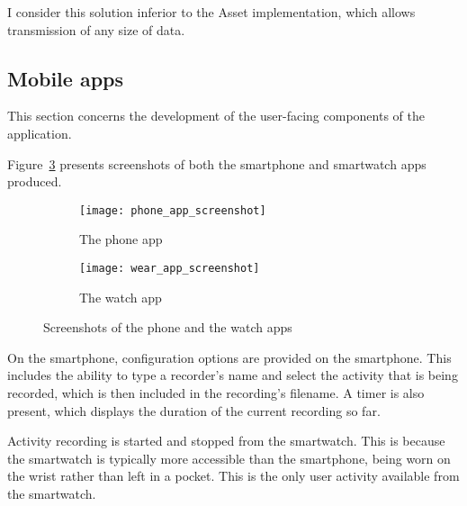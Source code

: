       I consider this solution inferior to the Asset implementation, which allows transmission of any size of data.
    \subsection{Mobile apps}
      This section concerns the development of the user-facing components of the application. 
      
      Figure~\ref{fig:app_screenshots} presents screenshots of both the smartphone and smartwatch apps produced.

      \begin{figure}[!th]
        \centering
        \begin{subfigure}[b]{0.3\textwidth}
                \texttt{[image: phone\_app\_screenshot]}
                \caption{The phone app}
                \label{fig:phone_app_screenshot}
        \end{subfigure}
        \qquad
        \begin{subfigure}[b]{0.3\textwidth}
                \texttt{[image: wear\_app\_screenshot]}
                \caption{The watch app}
                \label{fig:wear_app_screenshot}
        \end{subfigure}
        \caption{Screenshots of the phone and the watch apps}
        \label{fig:app_screenshots}
      \end{figure}
      
      On the smartphone, configuration options are provided on the smartphone. This includes the ability to type a recorder's name and select the activity that is being recorded, which is then included in the recording's filename. A timer is also present, which displays the duration of the current recording so far.
      
      Activity recording is started and stopped from the smartwatch. This is because the smartwatch is typically more accessible than the smartphone, being worn on the wrist rather than left in a pocket. This is the only user activity available from the smartwatch.
      
